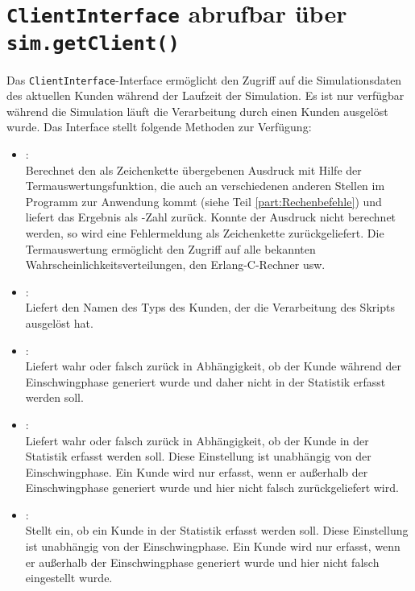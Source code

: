 \chapter{\texttt{ClientInterface} abrufbar über \texttt{sim.getClient()}}

Das \texttt{ClientInterface}-Interface ermöglicht den Zugriff auf die Simulationsdaten des aktuellen Kunden während
der Laufzeit der Simulation. Es ist nur verfügbar während die Simulation läuft die Verarbeitung durch
einen Kunden ausgelöst wurde. Das Interface stellt folgende Methoden zur Verfügung:

\begin{itemize}

\item
{}:\\
Berechnet den als Zeichenkette übergebenen Ausdruck mit Hilfe der Termauswertungsfunktion, die
auch an verschiedenen anderen Stellen im Programm zur Anwendung kommt (siehe Teil \ref{part:Rechenbefehle}) und liefert das Ergebnis
als -Zahl zurück. Konnte der Ausdruck nicht berechnet werden, so wird eine Fehlermeldung als
Zeichenkette zurückgeliefert. Die Termauswertung ermöglicht den Zugriff auf alle bekannten
Wahrscheinlichkeitsverteilungen, den Erlang-C-Rechner usw.

\item
{}:\\
Liefert den Namen des Typs des Kunden, der die Verarbeitung des Skripts ausgelöst hat.
    
\item
{}:\\
Liefert wahr oder falsch zurück in Abhängigkeit, ob der Kunde während der Einschwingphase generiert wurde und
daher nicht in der Statistik erfasst werden soll.
  
\item
{}:\\
Liefert wahr oder falsch zurück in Abhängigkeit, ob der Kunde in der Statistik erfasst werden soll.
Diese Einstellung ist unabhängig von der Einschwingphase. Ein Kunde wird nur erfasst, wenn er außerhalb
der Einschwingphase generiert wurde und hier nicht falsch zurückgeliefert wird.
  
\item
{}:\\
Stellt ein, ob ein Kunde in der Statistik erfasst werden soll.
Diese Einstellung ist unabhängig von der Einschwingphase. Ein Kunde wird nur erfasst, wenn er außerhalb
der Einschwingphase generiert wurde und hier nicht falsch eingestellt wurde.
  

\end{itemize}
